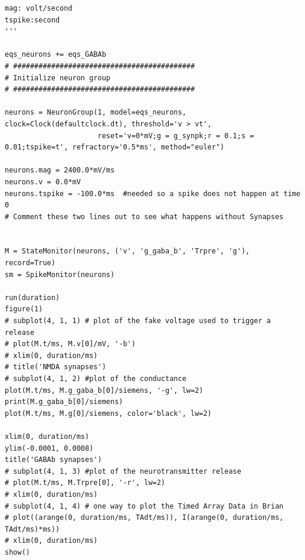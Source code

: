 \documentclass[12pt]{article}
\begin{document}
\begin{lstlisting}
mag: volt/second
tspike:second
'''

eqs_neurons += eqs_GABAb
# ###########################################
# Initialize neuron group
# ###########################################

neurons = NeuronGroup(1, model=eqs_neurons, clock=Clock(defaultclock.dt), threshold='v > vt',
                      reset='v=0*mV;g = g_synpk;r = 0.1;s = 0.01;tspike=t', refractory='0.5*ms', method="euler")

neurons.mag = 2400.0*mV/ms
neurons.v = 0.0*mV
neurons.tspike = -100.0*ms  #needed so a spike does not happen at time 0
# Comment these two lines out to see what happens without Synapses


M = StateMonitor(neurons, ('v', 'g_gaba_b', 'Trpre', 'g'), record=True)
sm = SpikeMonitor(neurons)

run(duration)
figure(1)
# subplot(4, 1, 1) # plot of the fake voltage used to trigger a release
# plot(M.t/ms, M.v[0]/mV, '-b')
# xlim(0, duration/ms)
# title('NMDA synapses')
# subplot(4, 1, 2) #plot of the conductance
plot(M.t/ms, M.g_gaba_b[0]/siemens, '-g', lw=2)
print(M.g_gaba_b[0]/siemens)
plot(M.t/ms, M.g[0]/siemens, color='black', lw=2)

xlim(0, duration/ms)
ylim(-0.0001, 0.0008)
title('GABAb synapses')
# subplot(4, 1, 3) #plot of the neurotransmitter release
# plot(M.t/ms, M.Trpre[0], '-r', lw=2)
# xlim(0, duration/ms)
# subplot(4, 1, 4) # one way to plot the Timed Array Data in Brian
# plot((arange(0, duration/ms, TAdt/ms)), I(arange(0, duration/ms, TAdt/ms)*ms))
# xlim(0, duration/ms)
show()
\end{lstlisting}
\newpage
\end{document}
